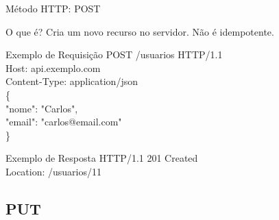 \documentclass[9pt]{beamer}
\begin{document}
\begin{frame}{Método HTTP: POST}

\begin{block}{O que é?}
Cria um novo recurso no servidor.
Não é idempotente.
\end{block}

\begin{block}{Exemplo de Requisição}
\ttfamily\footnotesize
POST /usuarios HTTP/1.1 \\
Host: api.exemplo.com \\
Content-Type: application/json \\

\{ \\
\quad "nome": "Carlos", \\
\quad "email": "carlos@email.com" \\
\}
\end{block}

\begin{block}{Exemplo de Resposta}
\ttfamily\footnotesize
HTTP/1.1 201 Created \\
Location: /usuarios/11
\end{block}

\begin{center}
\end{center}

\end{frame}

\subsection{PUT}
\end{document}
